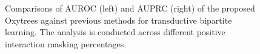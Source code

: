 \begin{appendices}
\begin{figure}[tbh]
    \caption{Comparisons of AUROC (left) and AUPRC (right) of the proposed Oxytrees against previous methods for transductive bipartite learning. The analysis is conducted across different positive interaction masking percentages.}
    \label{fig:literature transductive}
\end{figure}



%     
% 


\end{appendices}
